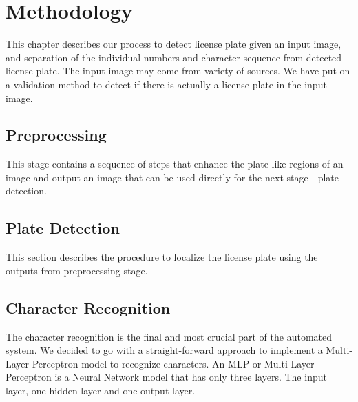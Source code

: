 \documentclass{standalone}
\begin{document}
\chapter{Methodology}
This chapter describes our process to detect license plate given an input image, and separation of the individual numbers and character sequence from detected license plate. The input image may come from variety of sources. We have put on a validation method to detect if there is actually a license plate in the input image.

  
  

\section{Preprocessing}
This stage contains a sequence of steps that enhance the plate like regions of an image and output an image that can be used directly for the next stage - plate detection.

  
  
  
  
  
  
  

\section{Plate Detection}
This section describes the procedure to localize the license plate using the outputs from preprocessing stage. 
  
  
  
  
  




\section{Character Recognition}
The character recognition is the final and most crucial part of the automated system. We decided to go with a straight-forward approach to implement a Multi-Layer Perceptron model to recognize characters. An MLP or Multi-Layer Perceptron is a Neural Network model that has only three layers. The input layer, one hidden layer and one output layer.

  
  
\end{document}
